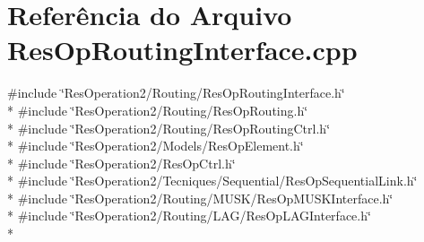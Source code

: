 \section{Referência do Arquivo Res\+Op\+Routing\+Interface.\+cpp}
\label{_res_op_routing_interface_8cpp}
{\ttfamily \#include \char`\"{}Res\+Operation2/\+Routing/\+Res\+Op\+Routing\+Interface.\+h\char`\"{}}\\*
{\ttfamily \#include \char`\"{}Res\+Operation2/\+Routing/\+Res\+Op\+Routing.\+h\char`\"{}}\\*
{\ttfamily \#include \char`\"{}Res\+Operation2/\+Routing/\+Res\+Op\+Routing\+Ctrl.\+h\char`\"{}}\\*
{\ttfamily \#include \char`\"{}Res\+Operation2/\+Models/\+Res\+Op\+Element.\+h\char`\"{}}\\*
{\ttfamily \#include \char`\"{}Res\+Operation2/\+Res\+Op\+Ctrl.\+h\char`\"{}}\\*
{\ttfamily \#include \char`\"{}Res\+Operation2/\+Tecniques/\+Sequential/\+Res\+Op\+Sequential\+Link.\+h\char`\"{}}\\*
{\ttfamily \#include \char`\"{}Res\+Operation2/\+Routing/\+M\+U\+S\+K/\+Res\+Op\+M\+U\+S\+K\+Interface.\+h\char`\"{}}\\*
{\ttfamily \#include \char`\"{}Res\+Operation2/\+Routing/\+L\+A\+G/\+Res\+Op\+L\+A\+G\+Interface.\+h\char`\"{}}\\*

